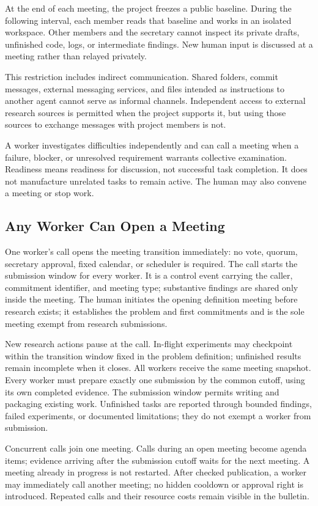 \documentclass[11pt]{article}
\begin{document}
At the end of each meeting, the project freezes a public baseline. During the following interval, each member reads that baseline and works in an isolated workspace. Other members and the secretary cannot inspect its private drafts, unfinished code, logs, or intermediate findings. New human input is discussed at a meeting rather than relayed privately.

This restriction includes indirect communication. Shared folders, commit messages, external messaging services, and files intended as instructions to another agent cannot serve as informal channels. Independent access to external research sources is permitted when the project supports it, but using those sources to exchange messages with project members is not.

A worker investigates difficulties independently and can call a meeting when a failure, blocker, or unresolved requirement warrants collective examination. Readiness means readiness for discussion, not successful task completion. It does not manufacture unrelated tasks to remain active. The human may also convene a meeting or stop work.

\subsection{Any Worker Can Open a Meeting}

One worker's call opens the meeting transition immediately: no vote, quorum, secretary approval, fixed calendar, or scheduler is required. The call starts the submission window for every worker. It is a control event carrying the caller, commitment identifier, and meeting type; substantive findings are shared only inside the meeting. The human initiates the opening definition meeting before research exists; it establishes the problem and first commitments and is the sole meeting exempt from research submissions.

New research actions pause at the call. In-flight experiments may checkpoint within the transition window fixed in the problem definition; unfinished results remain incomplete when it closes. All workers receive the same meeting snapshot. Every worker must prepare exactly one submission by the common cutoff, using its own completed evidence. The submission window permits writing and packaging existing work. Unfinished tasks are reported through bounded findings, failed experiments, or documented limitations; they do not exempt a worker from submission.

Concurrent calls join one meeting. Calls during an open meeting become agenda items; evidence arriving after the submission cutoff waits for the next meeting. A meeting already in progress is not restarted. After checked publication, a worker may immediately call another meeting; no hidden cooldown or approval right is introduced. Repeated calls and their resource costs remain visible in the bulletin.
\end{document}
